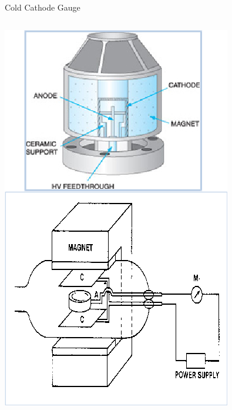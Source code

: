\documentclass[11pt]{beamer}
\begin{document}
\begin{frame}{Cold Cathode Gauge}


  \begin{columns}[]
    
      
       \begin{exampleblock}{}
         \begin{center}
			\includegraphics[width=1.0\textwidth]{ColdCathodeGauge.png}
		\end{center}
       \end{exampleblock}
       

\end{columns}
\end{frame}
\end{document}
